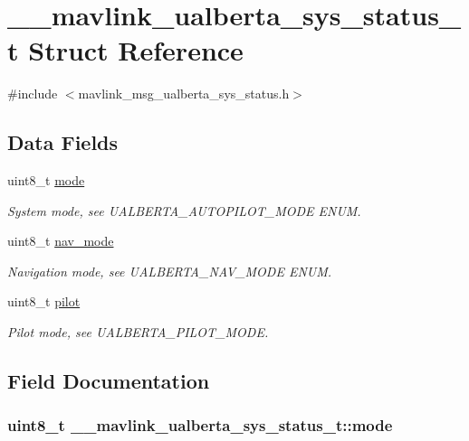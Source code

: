 \hypertarget{struct____mavlink__ualberta__sys__status__t}{\section{\+\_\+\+\_\+mavlink\+\_\+ualberta\+\_\+sys\+\_\+status\+\_\+t Struct Reference}
\label{struct____mavlink__ualberta__sys__status__t}
}


{\ttfamily \#include $<$mavlink\+\_\+msg\+\_\+ualberta\+\_\+sys\+\_\+status.\+h$>$}

\subsection*{Data Fields}
\begin{DoxyCompactItemize}
\item 
uint8\+\_\+t \hyperlink{struct____mavlink__ualberta__sys__status__t_a793943d0ff6f8d8aaaaf3c585faba0a5}{mode}
\begin{DoxyCompactList}\small\item\em System mode, see U\+A\+L\+B\+E\+R\+T\+A\+\_\+\+A\+U\+T\+O\+P\+I\+L\+O\+T\+\_\+\+M\+O\+D\+E E\+N\+U\+M. \end{DoxyCompactList}\item 
uint8\+\_\+t \hyperlink{struct____mavlink__ualberta__sys__status__t_a1c76bf629b8d711beea2541286d10235}{nav\+\_\+mode}
\begin{DoxyCompactList}\small\item\em Navigation mode, see U\+A\+L\+B\+E\+R\+T\+A\+\_\+\+N\+A\+V\+\_\+\+M\+O\+D\+E E\+N\+U\+M. \end{DoxyCompactList}\item 
uint8\+\_\+t \hyperlink{struct____mavlink__ualberta__sys__status__t_acfcd37f09994c3b0f1da60822e57cd05}{pilot}
\begin{DoxyCompactList}\small\item\em Pilot mode, see U\+A\+L\+B\+E\+R\+T\+A\+\_\+\+P\+I\+L\+O\+T\+\_\+\+M\+O\+D\+E. \end{DoxyCompactList}\end{DoxyCompactItemize}


\subsection{Field Documentation}
\hypertarget{struct____mavlink__ualberta__sys__status__t_a793943d0ff6f8d8aaaaf3c585faba0a5}{
\subsubsection[{mode}]{\setlength{\rightskip}{0pt plus 5cm}uint8\+\_\+t \+\_\+\+\_\+mavlink\+\_\+ualberta\+\_\+sys\+\_\+status\+\_\+t\+::mode}}\label{struct____mavlink__ualberta__sys__status__t_a793943d0ff6f8d8aaaaf3c585faba0a5}


